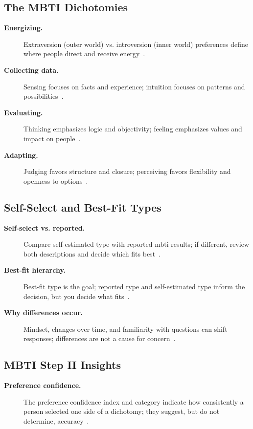 \documentclass[../main.tex]{subfiles}
\begin{document}
\subsection{The MBTI Dichotomies}
\begin{description}
  \item[\textbf{Energizing.}] Extraversion (outer world) vs. introversion (inner world) preferences define where people direct and receive energy~\autocite{edo-5-1-8-mbti-2025}.
  \item[\textbf{Collecting data.}] Sensing focuses on facts and experience; intuition focuses on patterns and possibilities~\autocite{edo-5-1-8-mbti-2025}.
  \item[\textbf{Evaluating.}] Thinking emphasizes logic and objectivity; feeling emphasizes values and impact on people~\autocite{edo-5-1-8-mbti-2025}.
  \item[\textbf{Adapting.}] Judging favors structure and closure; perceiving favors flexibility and openness to options~\autocite{edo-5-1-8-mbti-2025}.
\end{description}

\subsection{Self-Select and Best-Fit Types}
\begin{description}
  \item[\textbf{Self-select vs. reported.}] Compare self-estimated type with reported \ac{mbti} results; if different, review both descriptions and decide which fits best~\autocite{edo-5-1-8-mbti-2025}.
  \item[\textbf{Best-fit hierarchy.}] Best-fit type is the goal; reported type and self-estimated type inform the decision, but you decide what fits~\autocite{edo-5-1-8-mbti-2025}.
  \item[\textbf{Why differences occur.}] Mindset, changes over time, and familiarity with questions can shift responses; differences are not a cause for concern~\autocite{edo-5-1-8-mbti-2025}.
\end{description}

\subsection{MBTI Step II Insights}
\begin{description}
  \item[\textbf{Preference confidence.}] The preference confidence index and category indicate how consistently a person selected one side of a dichotomy; they suggest, but do not determine, accuracy~\autocite{edo-5-1-8-mbti-2025}.
\end{description}
\end{document}

